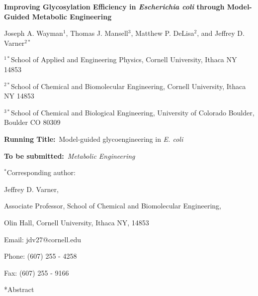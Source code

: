 \documentclass[12pt]{article}
\date{}
\makeatletter
\renewcommand\section{\@startsection
	{subsection}{2}{0mm}
	{-0.2in}
	{0.05\baselineskip}
	{\normalfont\large\bfseries}}
\makeatother
\begin{document}
\begin{titlepage}

{\par\centering\textbf{\Large Improving Glycosylation Efficiency in \textit{Escherichia coli} through Model-Guided Metabolic Engineering}}
\vspace{0.05in}
{\par \centering \large{Joseph A. Wayman$^{1}$, Thomas J. Mansell$^{3}$, Matthew P. DeLisa$^{2}$, and Jeffrey D. Varner$^{2*}$}}
\vspace{0.10in}
{\par \centering \large{$^{1*}$School of Applied and Engineering Physics, Cornell University, Ithaca NY 14853}}
{\par \centering \large{$^{2*}$School of Chemical and Biomolecular Engineering, Cornell University, Ithaca NY 14853}}
{\par \centering \large{$^{3*}$School of Chemical and Biological Engineering, University of Colorado Boulder, Boulder CO 80309}}
\vspace{0.1in}
{\par \centering \textbf{Running Title:}~Model-guided glycoengineering in \textit{E. coli}}
\vspace{0.1in}
{\par \centering \textbf{To be submitted:}~\emph{Metabolic Engineering}}
\vspace{0.5in}
{\par \centering $^{*}$Corresponding author:}
{\par \centering Jeffrey D. Varner,}
{\par \centering Associate Professor, School of Chemical and Biomolecular Engineering,}
{\par {} Olin Hall, Cornell University, Ithaca NY, 14853} 
{\par \centering Email: jdv27@cornell.edu} 
{\par \centering Phone: (607) 255 - 4258} 
{\par \centering Fax: (607) 255 - 9166} 
\end{titlepage}
\date{}
\thispagestyle{empty}
\pagebreak

\section*{Abstract}
\end{document}
